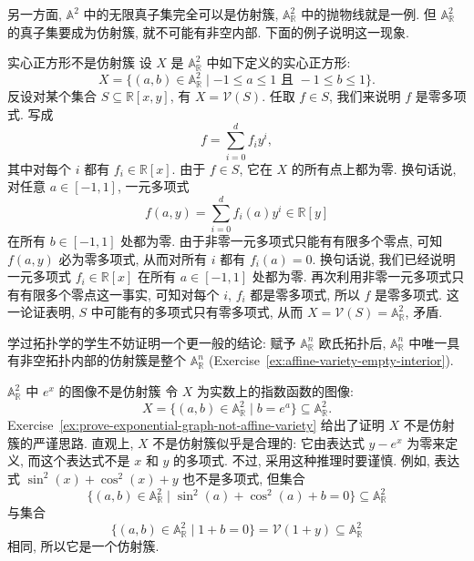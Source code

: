 另一方面, $\mathbb{A}^{2}$ 中的无限真子集完全可以是仿射簇, $\mathbb{A}^{2}_{\mathbb{R}}$ 中的抛物线就是一例. 但 $\mathbb{A}^{2}_{\mathbb{R}}$ 的真子集要成为仿射簇, 就不可能有非空内部. 下面的例子说明这一现象.

\begin{Example}{实心正方形不是仿射簇}\leavevmode\label{ex:solid-square-not-affine-variety}
  设 $X$ 是 $\mathbb{A}^{2}_{\mathbb{R}}$ 中如下定义的实心正方形:
  \[
    X=\{(a,b)\in\mathbb{A}^{2}_{\mathbb{R}}\mid-1\leq a\leq1
      \text{ 且 }-1\leq b\leq1\}.
  \]
  反设对某个集合 $S\subseteq\mathbb{R}[x,y]$, 有 $X=\mathcal{V}(S)$. 任取 $f\in S$, 我们来说明 $f$ 是零多项式. 写成
  \[
    f=\sum_{i=0}^{d}f_{i}y^{i},
  \]
  其中对每个 $i$ 都有 $f_{i}\in\mathbb{R}[x]$. 由于 $f\in S$, 它在 $X$ 的所有点上都为零. 换句话说, 对任意 $a\in[-1,1]$, 一元多项式
  \[
    f(a,y)=\sum_{i=0}^{d}f_{i}(a)y^{i}\in\mathbb{R}[y]
  \]
  在所有 $b\in[-1,1]$ 处都为零. 由于非零一元多项式只能有有限多个零点, 可知 $f(a,y)$ 必为零多项式, 从而对所有 $i$ 都有 $f_{i}(a)=0$. 换句话说, 我们已经说明一元多项式 $f_{i}\in\mathbb{R}[x]$ 在所有 $a\in[-1,1]$ 处都为零. 再次利用非零一元多项式只有有限多个零点这一事实, 可知对每个 $i$, $f_{i}$ 都是零多项式, 所以 $f$ 是零多项式. 这一论证表明, $S$ 中可能有的多项式只有零多项式, 从而 $X=\mathcal{V}(S)=\mathbb{A}^{2}_{\mathbb{R}}$, 矛盾.

  学过拓扑学的学生不妨证明一个更一般的结论: 赋予 $\mathbb{A}^{n}_{\mathbb{R}}$ 欧氏拓扑后, $\mathbb{A}^{n}_{\mathbb{R}}$ 中唯一具有非空拓扑内部的仿射簇是整个 $\mathbb{A}^{n}_{\mathbb{R}}$ (Exercise~\ref{ex:affine-variety-empty-interior}).
\end{Example}

\begin{Example}{$\mathbb{A}^{2}_{\mathbb{R}}$ 中 $e^{x}$ 的图像不是仿射簇}\leavevmode\label{ex:exponential-graph-not-affine-variety}
  令 $X$ 为实数上的指数函数的图像:
  \begin{equation}\label{eq:exponential-graph}
    X=\{(a,b)\in\mathbb{A}^{2}_{\mathbb{R}}\mid b=e^{a}\}\subseteq\mathbb{A}^{2}_{\mathbb{R}}.
  \end{equation}
  Exercise~\ref{ex:prove-exponential-graph-not-affine-variety} 给出了证明 $X$ 不是仿射簇的严谨思路. 直观上, $X$ 不是仿射簇似乎是合理的: 它由表达式 $y-e^{x}$ 为零来定义, 而这个表达式不是 $x$ 和 $y$ 的多项式. 不过, 采用这种推理时要谨慎. 例如, 表达式 $\sin^{2}(x)+\cos^{2}(x)+y$ 也不是多项式, 但集合
  \[
    \{(a,b)\in\mathbb{A}^{2}_{\mathbb{R}}\mid\sin^{2}(a)+\cos^{2}(a)+b=0\}
    \subseteq\mathbb{A}^{2}_{\mathbb{R}}
  \]
  与集合
  \[
    \{(a,b)\in\mathbb{A}^{2}_{\mathbb{R}}\mid1+b=0\}=\mathcal{V}(1+y)
    \subseteq\mathbb{A}^{2}_{\mathbb{R}}
  \]
  相同, 所以它是一个仿射簇.
\end{Example}

